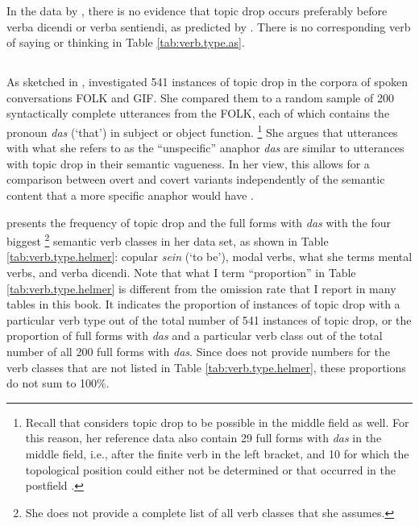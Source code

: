 In the data by \citet{androutsopoulos.schmidt2002}, there is no evidence that topic drop occurs preferably before verba dicendi or verba sentiendi, as predicted by \citet{imo2013}.
There is no corresponding verb of saying or thinking in Table \ref{tab:verb.type.as}.

\subsection{\citet{helmer2016}} 
As sketched in , \citet{helmer2016} investigated 541 instances of topic drop in the corpora of spoken conversations FOLK and GIF.
She compared them to a random sample of 200 syntactically complete utterances from the FOLK, each of which contains the pronoun \textit{das} (`that') in subject or object function.%
\footnote{Recall that \citet{helmer2016} considers topic drop to be possible in the middle field as well.
For this reason, her reference data also contain 29 full forms with \textit{das} in the middle field, i.e., after the finite verb in the left bracket, and 10 for which the topological position could either not be determined or that occurred in the postfield \citep[214]{helmer2016}.}
%
She argues that utterances with what she refers to as the ``unspecific'' anaphor \textit{das} are similar to utterances with topic drop in their semantic vagueness.
In her view, this allows for a comparison between overt and covert variants independently of the semantic content that a more specific anaphor would have \citep[197]{helmer2016}.

\citet{helmer2016} presents the frequency of topic drop and the full forms with \textit{das} with the four biggest%
\footnote{She does not provide a complete list of all verb classes that she assumes.}
%
semantic verb classes in her data set, as shown in Table \ref{tab:verb.type.helmer}:
copular \textit{sein} (`to be'), modal verbs, what she terms mental verbs, and verba dicendi.
Note that what I term ``proportion'' in Table \ref{tab:verb.type.helmer} is different from the omission rate that I report in many tables in this book.
It indicates the proportion of instances of topic drop with a particular verb type out of the total number of 541 instances of topic drop, or the proportion of full forms with \textit{das} and a particular verb class out of the total number of all 200 full forms with \textit{das}.
Since \citet{helmer2016} does not provide numbers for the verb classes that are not listed in Table \ref{tab:verb.type.helmer}, these proportions do not sum to 100\%.

